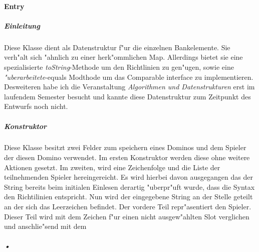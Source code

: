 \paragraph{Entry}
\label{par:entry}

\subparagraph{Einleitung}
Diese Klasse dient als Datenstruktur f"ur die einzelnen Bankelemente. Sie verh"alt sich "ahnlich zu einer herk"ommlichen Map. Allerdings bietet sie eine spezialisierte \emph{toString}-Methode um den Richtlinien zu gen"ugen, sowie eine \emph{"uberarbeitete}-equals Modthode um das Comparable interface zu implementieren. Desweiteren habe ich die Veranstaltung \emph{Algorithmen und Datenstrukturen} erst im laufendem Semester besucht und kannte diese Datenstruktur zum Zeitpunkt des Entwurfs noch nicht. 

\subparagraph{Konstruktor}
Diese Klasse besitzt zwei Felder zum speichern eines Dominos und dem Spieler der diesen Domino verwendet. Im ersten Konstruktor werden diese ohne weitere Aktionen gesetzt. Im zweiten, wird eine Zeichenfolge und die Liste der teilnehmenden Spieler hereingereicht. Es wird hierbei davon ausgegangen das der String bereits beim initialen Einlesen derartig "uberpr"uft wurde, dass die Syntax den Richtilinien entspricht. 
Nun wird der eingegebene String an der Stelle geteilt an der sich das Leerzeichen befindet. Der vordere Teil repr"asentiert den Spieler. Dieser Teil wird mit dem Zeichen f"ur einen nicht ausgew"ahlten Slot verglichen und anschlie"send mit dem 

\subparagraph{•}
